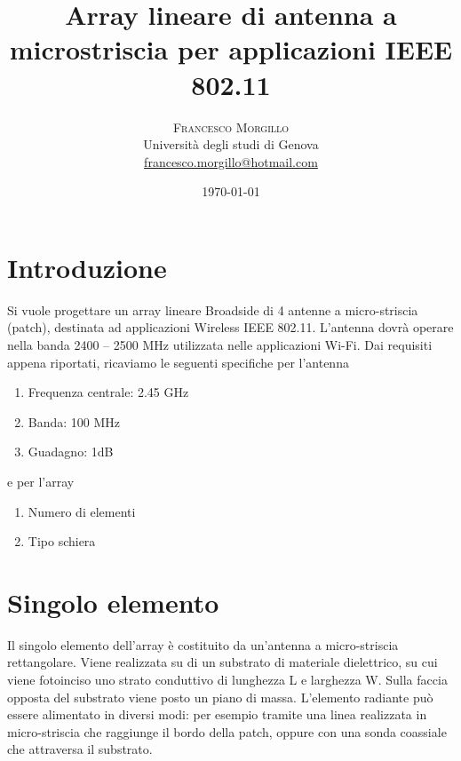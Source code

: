 \documentclass[twoside,twocolumn]{article}
\title{Array lineare di antenna a microstriscia per applicazioni IEEE 802.11} %
\author{%
\textsc{Francesco Morgillo}\\[1ex] %
\normalsize Università degli studi di Genova \\ %
\normalsize \href{mailto:francesco.morgillo@hotmail.com}{francesco.morgillo@hotmail.com} %
}
\date{\today} %
\begin{document}
\maketitle


\section{Introduzione}


Si vuole progettare un array lineare Broadside di 4 antenne a micro-striscia (patch), destinata ad applicazioni Wireless IEEE 802.11.
L'antenna dovrà operare nella banda 2400 – 2500 MHz utilizzata nelle applicazioni Wi-Fi.
Dai requisiti appena riportati, ricaviamo le seguenti specifiche per l'antenna

\begin{enumerate}[noitemsep] %
\item Frequenza centrale: 2.45 GHz
\item Banda: 100 MHz
\item Guadagno: 1dB 
\end{enumerate}
 e per l'array
 \begin{enumerate}[noitemsep] %
\item Numero di elementi
\item Tipo schiera
\end{enumerate}



\section{Singolo elemento}
Il singolo elemento dell'array è costituito da un'antenna a micro-striscia rettangolare.
Viene realizzata su di un substrato di materiale dielettrico, su cui viene fotoinciso uno strato conduttivo di lunghezza L e larghezza W. Sulla faccia opposta del substrato viene posto un piano di massa. L'elemento radiante può essere alimentato in diversi modi: per esempio tramite una linea realizzata in micro-striscia che raggiunge il bordo della patch, oppure con una sonda coassiale che attraversa il substrato.
\end{document}
